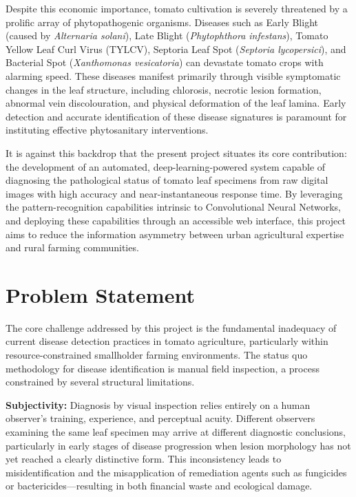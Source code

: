 \documentclass[12pt,a4paper]{report}
\begin{document}
Despite this economic importance, tomato cultivation is severely threatened by a prolific array of phytopathogenic organisms. Diseases such as Early Blight (caused by \textit{Alternaria solani}), Late Blight (\textit{Phytophthora infestans}), Tomato Yellow Leaf Curl Virus (TYLCV), Septoria Leaf Spot (\textit{Septoria lycopersici}), and Bacterial Spot (\textit{Xanthomonas vesicatoria}) can devastate tomato crops with alarming speed. These diseases manifest primarily through visible symptomatic changes in the leaf structure, including chlorosis, necrotic lesion formation, abnormal vein discolouration, and physical deformation of the leaf lamina. Early detection and accurate identification of these disease signatures is paramount for instituting effective phytosanitary interventions.

It is against this backdrop that the present project situates its core contribution: the development of an automated, deep-learning-powered system capable of diagnosing the pathological status of tomato leaf specimens from raw digital images with high accuracy and near-instantaneous response time. By leveraging the pattern-recognition capabilities intrinsic to Convolutional Neural Networks, and deploying these capabilities through an accessible web interface, this project aims to reduce the information asymmetry between urban agricultural expertise and rural farming communities.

\section{Problem Statement}

The core challenge addressed by this project is the fundamental inadequacy of current disease detection practices in tomato agriculture, particularly within resource-constrained smallholder farming environments. The status quo methodology for disease identification is manual field inspection, a process constrained by several structural limitations.

\textbf{Subjectivity:} Diagnosis by visual inspection relies entirely on a human observer's training, experience, and perceptual acuity. Different observers examining the same leaf specimen may arrive at different diagnostic conclusions, particularly in early stages of disease progression when lesion morphology has not yet reached a clearly distinctive form. This inconsistency leads to misidentification and the misapplication of remediation agents such as fungicides or bactericides---resulting in both financial waste and ecological damage.
\end{document}
